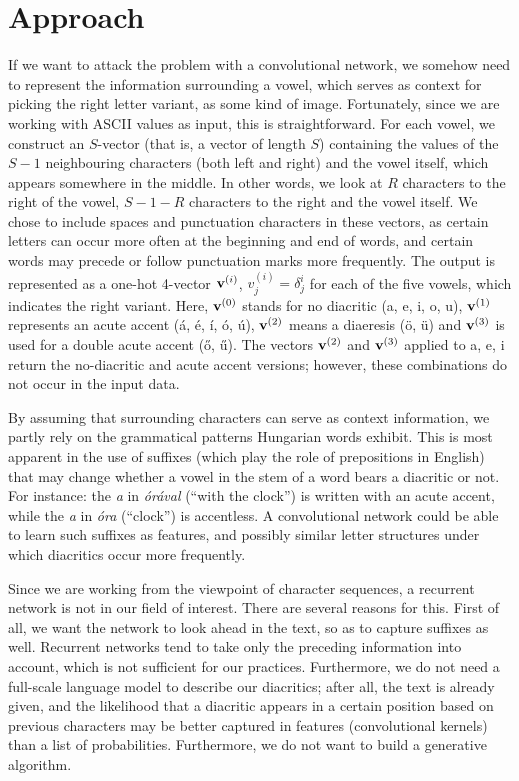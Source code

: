 \documentclass[11pt]{article}
\begin{document}
\section{Approach}
If we want to attack the problem with a convolutional network, we somehow need to represent the information surrounding a vowel, which serves as context for picking the right letter variant, as some kind of image. Fortunately, since we are working with ASCII values as input, this is straightforward. For each vowel, we construct an $S$-vector (that is, a vector of length $S$) containing the values of the $S-1$ neighbouring characters (both left and right) and the vowel itself, which appears somewhere in the middle. In other words, we look at $R$ characters to the right of the vowel, $S-1-R$ characters to the right and the vowel itself. We chose to include spaces and punctuation characters in these vectors, as certain letters can occur more often at the beginning and end of words, and certain words may precede or follow punctuation marks more frequently. The output is represented as a one-hot 4-vector $\boldsymbol{\mathrm{v}}^{(i)}$, $v^{(i)}_j=\delta^i_j$ for each of the five vowels, which indicates the right variant. Here, $\boldsymbol{\mathrm{v}}^{(0)}$ stands for no diacritic (a, e, i, o, u), $\boldsymbol{\mathrm{v}}^{(1)}$ represents an acute accent (á, é, í, ó, ú), $\boldsymbol{\mathrm{v}}^{(2)}$ means a diaeresis (ö, ü) and $\boldsymbol{\mathrm{v}}^{(3)}$ is used for a double acute accent (ő, ű). The vectors $\boldsymbol{\mathrm{v}}^{(2)}$ and $\boldsymbol{\mathrm{v}}^{(3)}$ applied to a, e, i return the no-diacritic and acute accent versions; however, these combinations do not occur in the input data.\par
By assuming that surrounding characters can serve as context information, we partly rely on the grammatical patterns Hungarian words exhibit. This is most apparent in the use of suffixes (which play the role of prepositions in English) that may change whether a vowel in the stem of a word bears a diacritic or not. For instance: the \textit{a} in \textit{órával} (``with the clock'') is written with an acute accent, while the \textit{a} in \textit{óra} (``clock'') is accentless. A convolutional network could be able to learn such suffixes as features, and possibly similar letter structures under which diacritics occur more frequently.\par
Since we are working from the viewpoint of character sequences, a recurrent network is not in our field of interest. There are several reasons for this. First of all, we want the network to look ahead in the text, so as to capture suffixes as well. Recurrent networks tend to take only the preceding information into account, which is not sufficient for our practices. Furthermore, we do not need a full-scale language model to describe our diacritics; after all, the text is already given, and the likelihood that a diacritic appears in a certain position based on previous characters may be better captured in features (convolutional kernels) than a list of probabilities. Furthermore, we do not want to build a generative algorithm.\par
\end{document}
